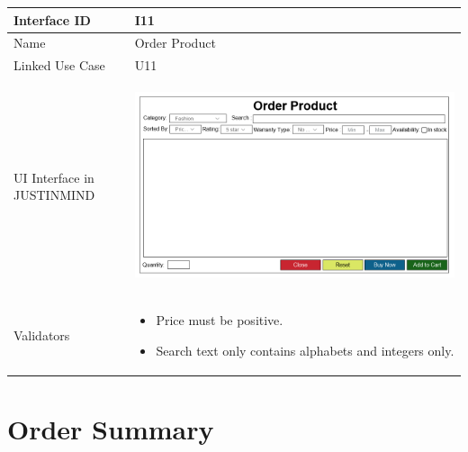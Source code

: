 \documentclass[12pt,a4paper]{report}
\begin{document}
\begin{tabular}{ | m{3cm} | m{12cm}| } \hline

Interface ID & I11  \\\hline

Name  &  Order Product \\ \hline

Linked Use Case & U11	 \\ \hline

UI Interface in JUSTINMIND & \begin{center} \includegraphics[scale=0.3]{./UIs for Latex Reports/UI-011 Order Product@1x.png}\end{center}  \\ \hline

Validators & 
\begin{itemize}
\item   
Price must be positive.
\item 
Search text only contains alphabets and integers only.

\end{itemize}
\\ \hline

\end{tabular} 
\section{Order Summary}
\end{document}
